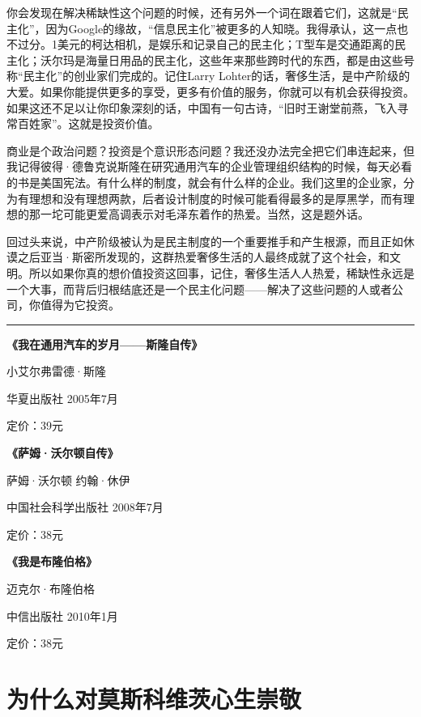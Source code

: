 你会发现在解决稀缺性这个问题的时候，还有另外一个词在跟着它们，这就是``民主化''，因为Google的缘故，``信息民主化''被更多的人知晓。我得承认，这一点也不过分。1美元的柯达相机，是娱乐和记录自己的民主化；T型车是交通距离的民主化；沃尔玛是海量日用品的民主化，这些年来那些跨时代的东西，都是由这些号称``民主化''的创业家们完成的。记住Larry
Lohter的话，奢侈生活，是中产阶级的大爱。如果你能提供更多的享受，更多有价值的服务，你就可以有机会获得投资。如果这还不足以让你印象深刻的话，中国有一句古诗，``旧时王谢堂前燕，飞入寻常百姓家''。这就是投资价值。

商业是个政治问题？投资是个意识形态问题？我还没办法完全把它们串连起来，但我记得彼得·德鲁克说斯隆在研究通用汽车的企业管理组织结构的时候，每天必看的书是美国宪法。有什么样的制度，就会有什么样的企业。我们这里的企业家，分为有理想和没有理想两款，后者设计制度的时候可能看得最多的是厚黑学，而有理想的那一坨可能更爱高调表示对毛泽东着作的热爱。当然，这是题外话。

回过头来说，中产阶级被认为是民主制度的一个重要推手和产生根源，而且正如休谟之后亚当·斯密所发现的，这群热爱奢侈生活的人最终成就了这个社会，和文明。所以如果你真的想价值投资这回事，记住，奢侈生活人人热爱，稀缺性永远是一个大事，而背后归根结底还是一个民主化问题------解决了这些问题的人或者公司，你值得为它投资。

\begin{center}\rule{0.5\linewidth}{0.5pt}\end{center}

\textbf{《我在通用汽车的岁月------斯隆自传》}

小艾尔弗雷德·斯隆

华夏出版社 2005年7月

定价：39元

\textbf{《萨姆·沃尔顿自传》}

萨姆·沃尔顿 约翰·休伊

中国社会科学出版社 2008年7月

定价：38元

\textbf{《我是布隆伯格》}

迈克尔·布隆伯格

中信出版社 2010年1月

定价：38元

\hypertarget{ux4e3aux4ec0ux4e48ux5bf9ux83abux65afux79d1ux7ef4ux8328ux5fc3ux751fux5d07ux656c}{%
\section{为什么对莫斯科维茨心生崇敬}\label{ux4e3aux4ec0ux4e48ux5bf9ux83abux65afux79d1ux7ef4ux8328ux5fc3ux751fux5d07ux656c}}

